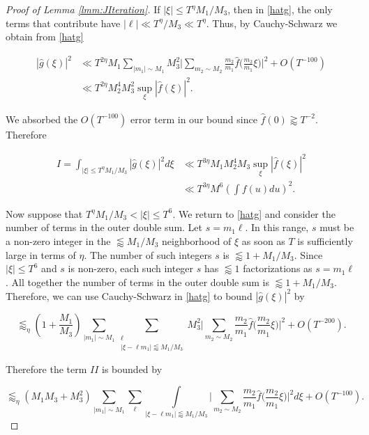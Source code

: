 \documentclass{amsart}
\theoremstyle{plain}
\numberwithin{equation}{section}
\begin{document}
\begin{proof}[Proof of  Lemma \ref{lmm:JIteration}]
 If $|\xi| \le T^\eta M_1/M_3$, then in \eqref{hatg}, the only terms that contribute have $|\ell| \ll T^\eta/M_3\ll T^\eta$.  Thus, by Cauchy-Schwarz we obtain from \eqref{hatg}

\begin{align*}
 | \widehat{g}(\xi) |^2 &\ll T^{2\eta} M_1 \sum_{|m_1| \sim M_1} M_3^2  \Big|   \sum_{m_2 \sim M_2} \frac{m_2}{m_1} \widehat{f} \Big( \frac{m_2}{m_1} \xi \Big) \Big|^2+O(T^{-100}) \\
&\ll T^{2\eta} M_2^4 M_3^2 \sup_{\xi} |\widehat{f}(\xi)|^2.
\end{align*}

We absorbed the $O(T^{-100})$ error term in our bound since $\widehat{f}(0)\gtrapprox T^{-2}$. Therefore 

\begin{align} 
I = \int_{|\xi| \le T^\eta M_1/M_3} |\widehat{g}(\xi)|^2 d \xi &\ll T^{3\eta} M_1 M_2^4 M_3 \sup_{\xi} |\widehat{f}(\xi)|^2\nonumber \\
& \ll T^{3\eta}M^6 \left( \int f(u) du \right)^2. \label{eq:IBound} 
\end{align}



Now suppose that $ T^\eta M_1/M_3<|\xi|\le T^6$. We return to \eqref{hatg} and consider the number of terms in the outer double sum. Let $s=m_1 \ell$. In this range, $s$ must be a non-zero integer in the $\lessapprox M_1/M_3$ neighborhood of $\xi$ as soon as $T$ is sufficiently large in terms of $\eta$.  The number of such integers $s$ is $\lessapprox 1 + M_1/M_3$.  Since $|\xi| \le T^6$ and $s$ is non-zero, each such integer $s$ has $\lessapprox 1$ factorizations as $s=m_1\ell$.  All together the number of terms in the outer double sum is $\lessapprox  1 + M_1/M_3$.  Therefore, we can use Cauchy-Schwarz in \eqref{hatg} to bound $|\widehat{g}(\xi)|^2$ by 

\[ 
\lessapprox_\eta \left(1 + \frac{M_1}{M_3} \right) \sum_{|m_1| \sim M_1}\sum_{\substack{\ell \\ |\xi - \ell m_1| \lessapprox M_1/M_3}}  M_3^2  \Big|   \sum_{m_2 \sim M_2} \frac{m_2}{m_1} \widehat{f} \Big( \frac{m_2}{m_1} \xi \Big) \Big|^2 +O(T^{-200}).
\]

Therefore the term $II$ is bounded by

\[\lessapprox_\eta  (M_1 M_3 + M_3^2) \sum_{|m_1| \sim M_1}\sum_{\ell}   \int\limits_{|\xi - \ell m_1| \lessapprox M_1/M_3}  \Big|   \sum_{m_2 \sim M_2} \frac{m_2}{m_1} \widehat{f} \Big( \frac{m_2}{m_1} \xi \Big) \Big|^2 d\xi+O(T^{-100}). \]


\end{proof}
\end{document}
